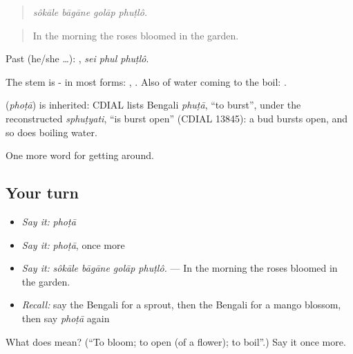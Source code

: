 \begin{quote}
   
\end{quote}

\begin{quote}
\emph{sôkāle bāgāne golāp phuṭlô.}
\end{quote}

\begin{quote}
In the morning the roses bloomed in the garden.
\end{quote}

Past (he/she …):   , \emph{sei phul phuṭlô}.

The stem is - in most forms: , . Also of water coming to the boil:  .

\begin{cousinweb}
\textbf{} (\emph{phoṭā}) is inherited: CDIAL lists Bengali \emph{phuṭā}, \textquotedblleft{}to burst\textquotedblright{}, under the reconstructed \emph{sphuṭyati}, \textquotedblleft{}is burst open\textquotedblright{} (CDIAL 13845): a bud bursts open, and so does boiling water.
\end{cousinweb}

\begin{grammarlens}[title={What you've built}]
One more word for getting around.
\end{grammarlens}

\subsection*{Your turn}
\begin{itemize}
\raggedright
  \item \emph{Say it:} \emph{phoṭā}
  \item \emph{Say it:} \emph{phoṭā}, once more
  \item \emph{Say it:} \emph{sôkāle bāgāne golāp phuṭlô.} — In the morning the roses bloomed in the garden.
  \item \emph{Recall:} say the Bengali for a sprout, then the Bengali for a mango blossom, then say \emph{phoṭā} again
\end{itemize}

\begin{tcolorbox}[breakable,colback=teal!4,colframe=teal!35!black,title={Before you move on}]
What does  mean? (\textquotedblleft{}To bloom; to open (of a flower); to boil\textquotedblright{}.) Say it once more.
\end{tcolorbox}
